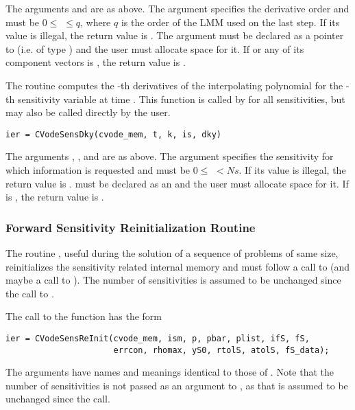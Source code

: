 The arguments  and  are as above.
The argument  specifies the derivative order and must be 
$0 \le$  $\le q$, where $q$ is the order of the LMM used on the last step.
If its value is illegal, the return value is .
The argument  must be declared as a pointer to  (i.e. of type
) and the user must allocate space for it. 
If  or any of its component vectors is , the return value is .

The routine  computes the -th derivatives of the interpolating 
polynomial for the -th sensitivity variable at time .
This function is called by  for all sensitivities, but may 
also be called directly by the user.
\begin{verbatim}
ier = CVodeSensDky(cvode_mem, t, k, is, dky)
\end{verbatim}

The arguments , , and  are as above.
The argument  specifies the sensitivity for which information
is requested and must be $0 \le$  $< Ns$. If its value is illegal, the return
value is .
 must be declared as an  and the user
must allocate space for it. If  is , the return value 
is .

\subsubsection{Forward Sensitivity Reinitialization Routine}\label{sss:cvsreinit}

The routine , useful during the solution of a sequence of problems of 
same size, reinitializes the sensitivity related internal memory 
and must follow a call to  (and maybe a call to ). 
The number  of sensitivities is assumed to be unchanged since the call to 
.

The call to the  function has the form
\begin{verbatim}
ier = CVodeSensReInit(cvode_mem, ism, p, pbar, plist, ifS, fS,
                      errcon, rhomax, yS0, rtolS, atolS, fS_data);
\end{verbatim}
The arguments have names and meanings identical to those of .
Note that the number of sensitivities  is not passed as an argument to 
, as that is assumed to be unchanged since 
the  call. 

